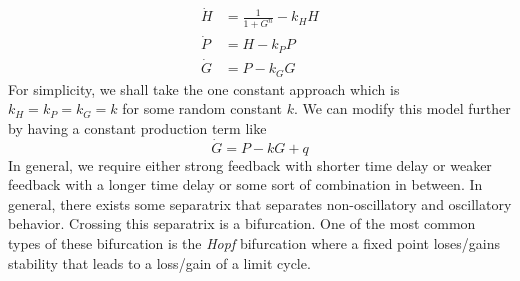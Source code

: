 \documentclass{article}
\theoremstyle{definition}
\begin{document}
\begin{equation*}
    \begin{split}
        \dot H &= \frac{1}{1+G^n} -k_H H \\
        \dot P &= H-k_PP\\
        \dot G &= P-k_GG
    \end{split}
\end{equation*}
For simplicity, we shall take the one constant approach which is $k_H=k_P=k_G=k$ for some random constant $k$. We can modify this model further by having a constant production term like 
\begin{equation*}
    \dot G = P-kG+q
\end{equation*}
In general, we require either strong feedback with shorter time delay or weaker feedback with a longer time delay or some sort of combination in between. In general, there exists some separatrix that separates non-oscillatory and oscillatory behavior. Crossing this separatrix is a bifurcation. One of the most common types of these bifurcation is the \emph{Hopf} bifurcation where a fixed point loses/gains stability that leads to a loss/gain of a limit cycle.
\end{document}

